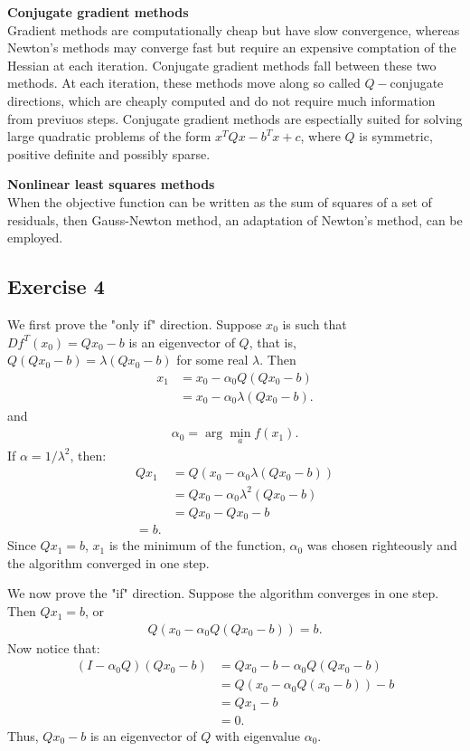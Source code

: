 \documentclass[11.5pt, letterpaper, bibtotoc,
    tablecaptionabove, figurecaptionabove]{article}
\begin{document}
\textbf{Conjugate gradient methods}\\
Gradient methods are computationally cheap but have slow convergence,
whereas Newton's methods may converge fast but require an expensive comptation of the Hessian
at each iteration.
Conjugate gradient methods fall between these two methods.
At each iteration, these methods move along so called $Q-$conjugate directions,
which are cheaply computed and do not require much information from previuos steps.
Conjugate gradient methods are espectially suited for solving large quadratic problems
of the form $x^TQx-b^Tx+c$, where $Q$ is symmetric, positive definite and possibly sparse.

\textbf{Nonlinear least squares methods}\\
When the objective function can be written as the sum of squares of a set of residuals,
then Gauss-Newton method, an adaptation of Newton's method, can be employed.

\subsection*{Exercise 4}
We first prove the "only if" direction.
Suppose $x_0$ is such that $Df^T(x_0)=Qx_0-b$ is an eigenvector of $Q$,
that is, $Q(Qx_0-b)=\lambda(Qx_0-b)$ for some real $\lambda$.
Then 
\begin{align*}
    x_1&=x_0-\alpha_0Q(Qx_0-b)\\
    &=x_0-\alpha_0\lambda(Qx_0-b).
\end{align*}
and 
\begin{align*}
    \alpha_0=\arg\min_a f(x_1).
\end{align*}
If $\alpha=1/\lambda^2$, then:
\begin{align*}
    Qx_1&=Q(x_0-\alpha_0\lambda(Qx_0-b))\\
    &=Qx_0-\alpha_0\lambda^2(Qx_0-b)\\
    &=Qx_0-Qx_0-b\\
    =b.
\end{align*}
Since $Qx_1=b$, $x_1$ is the minimum of the function,
$\alpha_0$ was chosen righteously and the algorithm converged in one step.

We now prove the "if" direction.
Suppose the algorithm converges in one step.
Then $Qx_1=b$, or
\begin{align*}
    Q(x_0-\alpha_0Q(Qx_0-b))=b.
\end{align*}
Now notice that:
\begin{align*}
    (I-\alpha_0Q)(Qx_0-b)&=Qx_0-b-\alpha_0Q(Qx_0-b)\\
    &=Q(x_0-\alpha_0Q(x_0-b))-b\\
    &=Qx_1-b\\
    &=0.
\end{align*}
Thus, $Qx_0-b$ is an eigenvector of $Q$ with eigenvalue $\alpha_0$.
\end{document}
